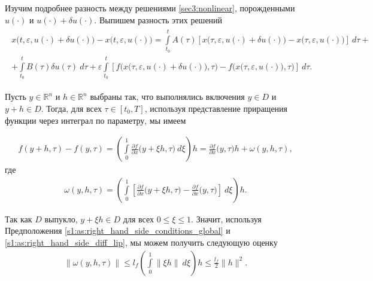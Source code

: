 \documentclass[../main.tex]{subfiles}
\begin{document}
Изучим подробнее разность между решениями \eqref{sec3:nonlinear}, порожденными $u(\cdot)$ и $u(\cdot) + \delta u(\cdot)$. 
Выпишем разность этих решений
\begin{gather}\label{diff_of_x}
    \begin{gathered}
        x\big(t,\varepsilon, u(\cdot) + \delta u(\cdot)\big) -
        x\big(t,\varepsilon, u(\cdot)\big) 
        = \int\limits_{t_0}^t A(\tau) \left[
        x\big(\tau,\varepsilon, u(\cdot) + \delta u(\cdot)\big) -
        x\big(\tau,\varepsilon, u(\cdot)\big) 
        \right]\ d\tau + \\ +
        \int\limits_{t_0}^t B(\tau) \delta u(\tau)\ d\tau +
        \varepsilon\int\limits_{t_0}^t \left[ 
        f\Big(x\big(\tau,\varepsilon, u(\cdot) + \delta u(\cdot)\big),\tau\Big) -
        f\Big(x\big(\tau,\varepsilon, u(\cdot)\big),\tau\Big)
        \right]\ d\tau.
    \end{gathered}
\end{gather}

Пусть $y \in \mathbb{R}^n$ и $h \in \mathbb{R}^n$ выбраны так, что выполнялись включения $y\in D$ и $y+h \in D$. 
Тогда, для всех $\tau \in [t_0,T]$, используя представление приращения функции через интеграл по параметру, мы имеем

\begin{gather*}
    f(y + h, \tau) - f(y,\tau) = 
    \left( \int\limits_{0}^{1} 
    \frac{\partial f}{\partial x}  \big(y + \xi h, \tau\big)\ d\xi \right) h =
    \frac{\partial f}{\partial x}  \big(y, \tau\big) h + \omega(y,h,\tau),
\end{gather*}
где 
\begin{gather*}
    \omega(y,h,\tau) = \left( \int\limits_{0}^{1} 
    \left[\frac{\partial f}{\partial x}  \big(y + \xi h, \tau\big) -
    \frac{\partial f}{\partial x}  \big(y, \tau\big) \right] \ d \xi \right) h.
\end{gather*}

Так как $D$ выпукло, $ y + \xi h \in D$ для всех $0 \leqslant \xi \leqslant 1$.
Значит, используя Предположения \ref{s1:as:right_hand_side_conditions_global} и \ref{s1:as:right_hand_side_diff_lip},  мы можем получить следующую оценку
\begin{gather*}
    \|\omega(y,h,\tau)\| \leqslant l_f \left( \int\limits_0^1  \left\| \xi h \right\| \ d\xi \right)h  \leqslant \frac{l_f}{2} \|h\|^2.
\end{gather*}
\end{document}
